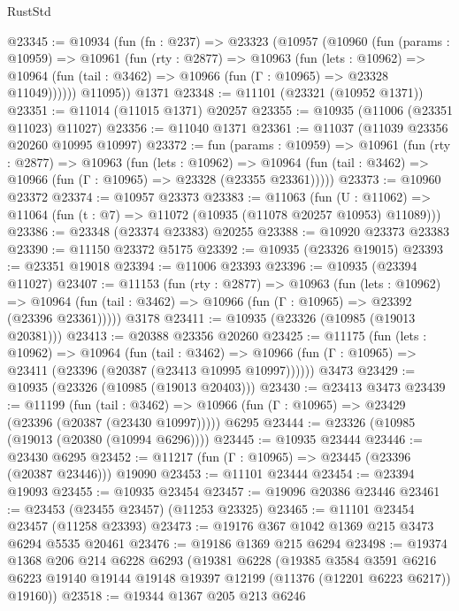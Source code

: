 \begin{lexlean}{RustStd}
\begin{coremodule}
{{{{{{{{{{{{{{{{{{{@23345 := @10934
    (fun (fn : @237) =>
    @23323
      (@10957
        (@10960
          (fun (params : @10959) =>
          @10961
            (fun (rty : @2877) =>
            @10963
              (fun (lets : @10962) =>
              @10964 (fun (tail : @3462) => @10966 (fun (Γ : @10965) => @23328 @11049))))))
        @11095))
    @1371
@23348 := @11101 (@23321 (@10952 @1371))
@23351 := @11014 (@11015 @1371) @20257
@23355 := @10935 (@11006 (@23351 @11023) @11027)
@23356 := @11040 @1371
@23361 := @11037 (@11039 @23356 @20260 @10995 @10997)
@23372 := fun (params : @10959) =>
  @10961
    (fun (rty : @2877) =>
    @10963
      (fun (lets : @10962) =>
      @10964 (fun (tail : @3462) => @10966 (fun (Γ : @10965) => @23328 (@23355 @23361)))))
@23373 := @10960 @23372
@23374 := @10957 @23373
@23383 := @11063
    (fun (U : @11062) => @11064 (fun (t : @7) => @11072 (@10935 (@11078 @20257 @10953) @11089)))
@23386 := @23348 (@23374 @23383) @20255
@23388 := @10920 @23373 @23383
@23390 := @11150 @23372 @5175
@23392 := @10935 (@23326 @19015)
@23393 := @23351 @19018
@23394 := @11006 @23393
@23396 := @10935 (@23394 @11027)
@23407 := @11153
    (fun (rty : @2877) =>
    @10963
      (fun (lets : @10962) =>
      @10964 (fun (tail : @3462) => @10966 (fun (Γ : @10965) => @23392 (@23396 @23361)))))
    @3178
@23411 := @10935 (@23326 (@10985 (@19013 @20381)))
@23413 := @20388 @23356 @20260
@23425 := @11175
    (fun (lets : @10962) =>
    @10964
      (fun (tail : @3462) =>
      @10966 (fun (Γ : @10965) => @23411 (@23396 (@20387 (@23413 @10995 @10997))))))
    @3473
@23429 := @10935 (@23326 (@10985 (@19013 @20403)))
@23430 := @23413 @3473
@23439 := @11199
    (fun (tail : @3462) => @10966 (fun (Γ : @10965) => @23429 (@23396 (@20387 (@23430 @10997)))))
    @6295
@23444 := @23326 (@10985 (@19013 (@20380 (@10994 @6296))))
@23445 := @10935 @23444
@23446 := @23430 @6295
@23452 := @11217 (fun (Γ : @10965) => @23445 (@23396 (@20387 @23446))) @19090
@23453 := @11101 @23444
@23454 := @23394 @19093
@23455 := @10935 @23454
@23457 := @19096 @20386 @23446
@23461 := @23453 (@23455 @23457) (@11253 @23325)
@23465 := @11101 @23454 @23457 (@11258 @23393)
@23473 := @19176 @367 @1042 @1369 @215 @3473 @6294 @5535 @20461
@23476 := @19186 @1369 @215 @6294
@23498 := @19374
    @1368
    @206
    @214
    @6228
    @6293
    (@19381
      @6228
      (@19385
        @3584
        @3591
        @6216
        @6223
        @19140
        @19144
        @19148
        @19397
        @12199
        (@11376 (@12201 @6223 @6217))
        @19160))
@23518 := @19344
    @1367
    @205
    @213
    @6246
}}}}}}}}}}}}}}}}}}}
\end{coremodule}
\end{lexlean}
